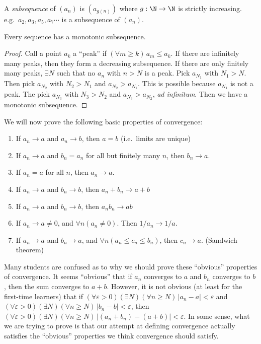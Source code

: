 \documentclass[a4paper]{article}
\begin{document}
\begin{defi}[Subsequence]
  A \emph{subsequence} of $(a_n)$ is $(a_{g(n)})$ where $g: \N\to\N$ is strictly increasing. e.g.\ $a_2, a_3, a_5, a_7\cdots$ is a subsequence of $(a_n)$.
\end{defi}

\begin{thm}
  Every sequence has a monotonic subsequence.
\end{thm}

\begin{proof}
  Call a point $a_k$ a ``peak'' if $(\forall m \geq k)\,a_m \leq a_k$. If there are infinitely many peaks, then they form a decreasing subsequence. If there are only finitely many peaks, $\exists N$ such that no $a_n$ with $n > N$ is a peak. Pick $a_{N_1}$ with $N_1 > N$. Then pick $a_{N_2}$ with $N_2 > N_1$ and $a_{N_2} > a_{N_1}$. This is possible because $a_{N_1}$ is not a peak. The pick $a_{N_3}$ with $N_3 > N_2$ and $a_{N_3}> a_{N_2}$, \emph{ad infinitum}. Then we have a monotonic subsequence.
\end{proof}

We will now prove the following basic properties of convergence:
\begin{thm}\leavevmode
  \begin{enumerate}
    \item If $a_n\to a$ and $a_n\to b$, then $a = b$ (i.e.\ limits are unique)
    \item If $a_n \to a$ and $b_n = a_n$ for all but finitely many $n$, then $b_n \to a$.
    \item If $a_n = a$ for all $n$, then $a_n \to a$.
    \item If $a_n\to a$ and $b_n\to b$, then $a_n + b_n \to a+ b$
    \item If $a_n\to a$ and $b_n \to b$, then $a_nb_n\to ab$
    \item If $a_n\to a\not= 0$, and $\forall n(a_n \not= 0)$. Then $1/a_n \to 1/a$.
    \item If $a_n \to a$ and $b_n \to a$, and $\forall n(a_n\leq c_n\leq b_n)$, then $c_n \to a$. (Sandwich theorem)
  \end{enumerate}
\end{thm}
Many students are confused as to why we should prove these ``obvious'' properties of convergence. It seems ``obvious'' that if $a_n$ converges to $a$ and $b_n$ converges to $b$, then the sum converges to $a + b$. However, it is not obvious (at least for the first-time learners) that if $(\forall \varepsilon > 0)(\exists N)(\forall n \geq N)\, |a_n - a| < \varepsilon$ and $(\forall \varepsilon > 0)(\exists N)(\forall n \geq N)\, |b_n - b| < \varepsilon$, then $(\forall \varepsilon > 0)(\exists N)(\forall n \geq N)\, |(a_n + b_n) - (a + b)| < \varepsilon$. In some sense, what we are trying to prove is that our attempt at defining convergence actually satisfies the ``obvious'' properties we think convergence should satisfy.
\end{document}
